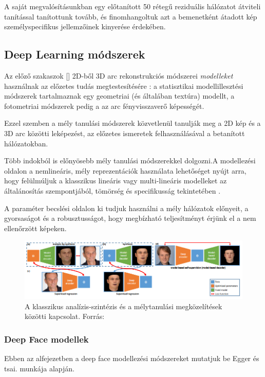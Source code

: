 \documentclass[12pt,a4]{article}
\begin{document}
    A saját megvalósításunkban egy előtanított 50 rétegű reziduális hálózatot átviteli tanítással tanítottunk tovább, és finomhangoltuk azt a bemenetként átadott kép személyspecifikus jellemzőinek kinyerése érdekében.
    
    \subsection{Deep Learning módszerek}
	
	Az előző szakaszok [] 2D-ből 3D arc rekonstrukciós módszerei \textit{modelleket} használnak az előzetes tudás megtestesítésére \cite{survey}: a statisztikai modellillesztési módszerek tartalmaznak egy geometriai (és általában textúra) modellt, a fotometriai módszerek pedig a
	az arc fényvisszaverő képességét. 
	
	
	Ezzel szemben a mély tanulási módszerek
	közvetlenül tanulják meg a 2D kép és a 3D arc közötti leképezést, az előzetes ismeretek felhasználásával a betanított hálózatokban.
	
	
	Több indokból is előnyösebb mély tanulási módszerekkel dolgozni.\cite{3dmm}A modellezési oldalon a nemlineáris, mély reprezentációk használata lehetőséget nyújt arra, hogy felülmúljuk a klasszikus lineáris vagy multi-lineáris modelleket az általánosítás szempontjából, tömörség és specifikusság tekintetében \cite{styner}.
	
	
	A paraméter becslési oldalon ki tudjuk használni a mély hálózatok előnyeit, a gyorsaságot és a robusztusságot, hogy megbízható teljesítményt érjünk el a nem ellenőrzött képeken.
	
	\begin{figure}[h]	
		\centering
		\includegraphics[width=1\linewidth]{deep}
		\caption{A klasszikus analízis-szintézis és a mélytanulási megközelítések közötti kapcsolat. 
			Forrás:\cite{3dmm}}
	\end{figure}
	
	\newpage
	\subsubsection{Deep Face modellek}
    Ebben az alfejezetben a deep face modellezési módszereket mutatjuk be \cite{3dmm} Egger és tsai. munkája alapján. \\
 
\end{document}
